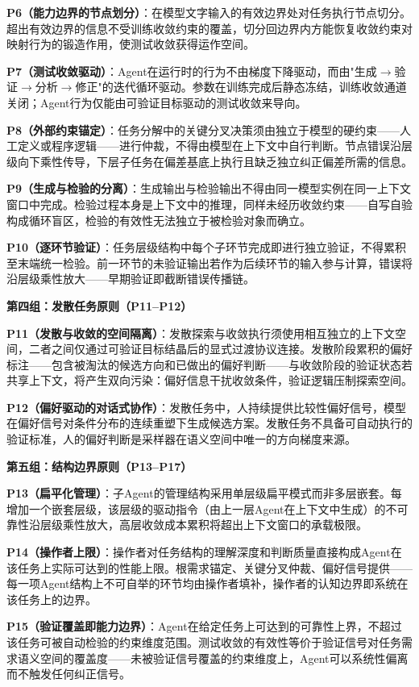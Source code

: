 \documentclass[11pt,a4paper]{article}
\theoremstyle{definition}
\begin{document}
\textbf{P6（能力边界的节点划分）}：在模型文字输入的有效边界处对任务执行节点切分。超出有效边界的信息不受训练收敛约束的覆盖，切分回边界内方能恢复收敛约束对映射行为的锻造作用，使测试收敛获得运作空间。

\textbf{P7（测试收敛驱动）}：Agent在运行时的行为不由梯度下降驱动，而由"生成$\to$验证$\to$分析$\to$修正"的迭代循环驱动。参数在训练完成后静态冻结，训练收敛通道关闭；Agent行为仅能由可验证目标驱动的测试收敛来导向。

\textbf{P8（外部约束锚定）}：任务分解中的关键分叉决策须由独立于模型的硬约束——人工定义或程序逻辑——进行仲裁，不得由模型在上下文中自行判断。节点错误沿层级向下乘性传导，下层子任务在偏差基底上执行且缺乏独立纠正偏差所需的信息。

\textbf{P9（生成与检验的分离）}：生成输出与检验输出不得由同一模型实例在同一上下文窗口中完成。检验过程本身是上下文中的推理，同样未经历收敛约束——自写自验构成循环盲区，检验的有效性无法独立于被检验对象而确立。

\textbf{P10（逐环节验证）}：任务层级结构中每个子环节完成即进行独立验证，不得累积至末端统一检验。前一环节的未验证输出若作为后续环节的输入参与计算，错误将沿层级乘性放大——早期验证即截断错误传播链。

\medskip
\textbf{第四组：发散任务原则（P11--P12）}

\textbf{P11（发散与收敛的空间隔离）}：发散探索与收敛执行须使用相互独立的上下文空间，二者之间仅通过可验证目标结晶后的显式过渡协议连接。发散阶段累积的偏好标注——包含被淘汰的候选方向和已做出的偏好判断——与收敛阶段的验证状态若共享上下文，将产生双向污染：偏好信息干扰收敛条件，验证逻辑压制探索空间。

\textbf{P12（偏好驱动的对话式协作）}：发散任务中，人持续提供比较性偏好信号，模型在偏好信号对条件分布的连续重塑下生成候选方案。发散任务不具备可自动执行的验证标准，人的偏好判断是采样器在语义空间中唯一的方向梯度来源。

\medskip
\textbf{第五组：结构边界原则（P13--P17）}

\textbf{P13（扁平化管理）}：子Agent的管理结构采用单层级扁平模式而非多层嵌套。每增加一个嵌套层级，该层级的驱动指令（由上一层Agent在上下文中生成）的不可靠性沿层级乘性放大，高层收敛成本累积将超出上下文窗口的承载极限。

\textbf{P14（操作者上限）}：操作者对任务结构的理解深度和判断质量直接构成Agent在该任务上实际可达到的性能上限。根需求锚定、关键分叉仲裁、偏好信号提供——每一项Agent结构上不可自举的环节均由操作者填补，操作者的认知边界即系统在该任务上的边界。

\textbf{P15（验证覆盖即能力边界）}：Agent在给定任务上可达到的可靠性上界，不超过该任务可被自动检验的约束维度范围。测试收敛的有效性等价于验证信号对任务需求语义空间的覆盖度——未被验证信号覆盖的约束维度上，Agent可以系统性偏离而不触发任何纠正信号。
\end{document}
